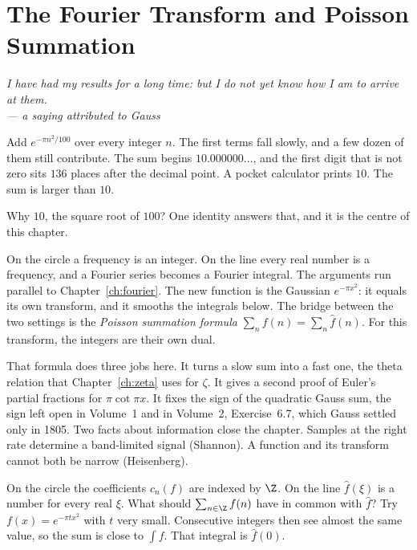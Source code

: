 \chapter{The Fourier Transform and Poisson Summation}\label{ch:transform}

\begin{center}\itshape
I have had my results for a long time: but I do not yet know how I am to arrive at them.\\
\upshape --- a saying attributed to Gauss
\end{center}

Add $e^{-\pi n^2/100}$ over every integer $n$. The first terms fall slowly, and a few dozen of them still contribute. The sum begins $10.000000\ldots$, and the first digit that is not zero sits $136$ places after the decimal point. A pocket calculator prints $10$. The sum is larger than $10$.

Why $10$, the square root of $100$? One identity answers that, and it is the centre of this chapter.

On the circle a frequency is an integer. On the line every real number is a frequency, and a Fourier series becomes a Fourier integral. The arguments run parallel to Chapter~\ref{ch:fourier}. The new function is the Gaussian $e^{-\pi x^2}$: it equals its own transform, and it smooths the integrals below. The bridge between the two settings is the \emph{Poisson summation formula} $\sum_nf(n)=\sum_n\hat f(n)$. For this transform, the integers are their own dual.

That formula does three jobs here. It turns a slow sum into a fast one, the theta relation that Chapter~\ref{ch:zeta} uses for $\zeta$. It gives a second proof of Euler's partial fractions for $\pi\cot\pi x$. It fixes the sign of the quadratic Gauss sum, the sign left open in Volume~1 and in Volume~2, Exercise~6.7, which Gauss settled only in 1805. Two facts about information close the chapter. Samples at the right rate determine a band-limited signal (Shannon). A function and its transform cannot both be narrow (Heisenberg).

\begin{think}
On the circle the coefficients $c_n(f)$ are indexed by $\Z$. On the line $\hat f(\xi)$ is a number for every real $\xi$. What should $\sum_{n\in\Z}f(n)$ have in common with $\hat f$? Try $f(x)=e^{-\pi tx^2}$ with $t$ very small. Consecutive integers then see almost the same value, so the sum is close to $\int f$. That integral is $\hat f(0)$.
\end{think}

